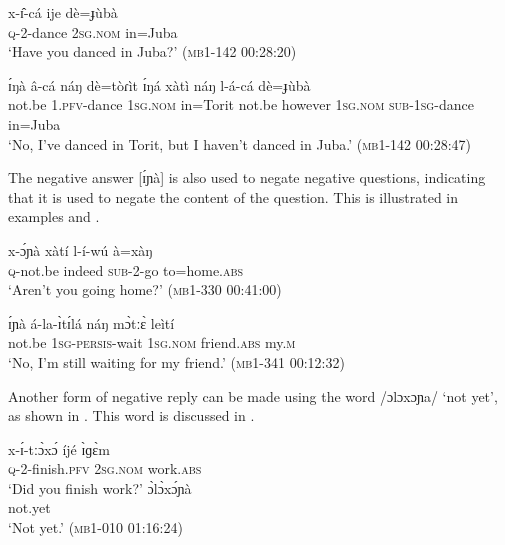 \documentclass[output=paper,colorlinks,citecolor=brown,draftmode]{langscibook}
\begin{document}
\ea\label{ex:lop:73}
        \gll x-ɪ̂-cá  ije dè=ɟùbà \\ 
             \textsc{q}{}-2-dance 2\textsc{sg.nom} {in=Juba} \\
        \glt ‘Have you danced in Juba?’      (\textsc{mb1-142} \textsc{00}:28:20)
\z

\ea\label{ex:lop:74}
        \gll ɪ́ŋà â-cá  náŋ dè=tòɾìt ɪ́ŋá xàtì náŋ l-á-cá dè=ɟùbà \\ 
             not.be 1.\textsc{pfv}{}-dance 1\textsc{sg.nom} {in=Torit} not.be however 1\textsc{sg.nom} \textsc{sub}{}-1\textsc{sg}{}-dance {in=Juba} \\
        \glt ‘No, I’ve danced in Torit, but I haven’t danced in Juba.’ (\textsc{mb1-142} \textsc{00}:28:47)
\z

The negative answer [ɪ́ɲà] is also used to negate negative questions, indicating that it is used to negate the content of the question. This is illustrated in examples  and . 

\ea\label{ex:lop:75}
        \gll x-ɔ́ɲà  xàtí l-í-wú à=xàŋ \\ 
             \textsc{q}{}-not.be indeed \textsc{sub}{}-2-go to=home.\textsc{abs} \\
        \glt ‘Aren’t you going home?’   (\textsc{mb1-330} \textsc{00:}41:00)
\z

\ea\label{ex:lop:76}
        \gll ɪ́ɲà á-la-ɪ̀tɪ́lá náŋ mɔ̀tːɛ̀ leìtí  \\ 
             not.be \textsc{1sg-persis-}wait 1\textsc{sg.nom} friend.\textsc{abs} my.\textsc{m} \\
        \glt ‘No, I’m still waiting for my friend.’ (\textsc{mb1-341} \textsc{00:}12:32)
\z

Another form of negative reply can be made using the word /ɔlɔxɔɲa/ ‘not yet’, as shown in .  This word is discussed in .


\ea\label{ex:lop:77}
    \begin{xlist}[Q: ]
    \label{ex:lop:77Q}
        \gll x-ɪ́-tːɔ̀xɔ́  íjé ɪ̀ɡɛ̀m\\ 
             \textsc{q}{}-2-finish.\textsc{pfv} 2\textsc{sg.nom} work.\textsc{abs} \\
        \glt ‘Did you finish work?’   
    \label{ex:lop:77A}
        \gll ɔ̀lɔ̀xɔ́ɲà \\ 
              not.yet \\
        \glt   ‘Not yet.’      (\textsc{mb1-010} \textsc{0}1:16:24)
    \end{xlist}
\z 
\end{document}
